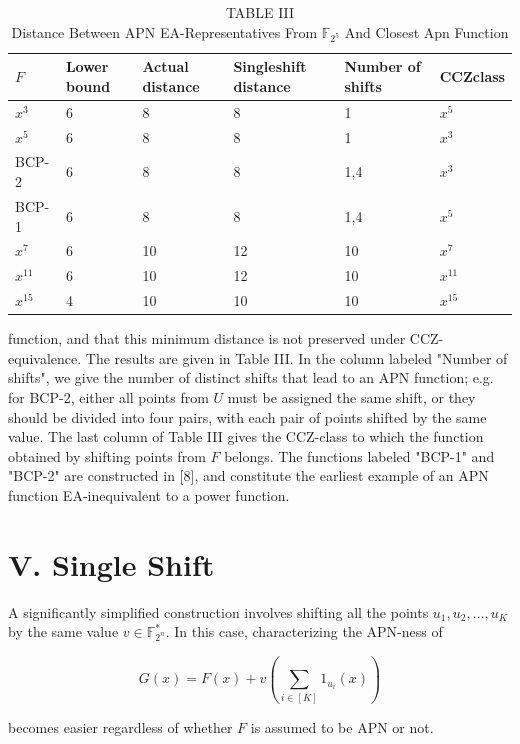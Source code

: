 \documentclass[10pt]{article}
\begin{document}
\begin{table}[h]
\begin{center}
\captionsetup{labelformat=empty}
\caption{TABLE III\\
Distance Between APN EA-Representatives From $\mathbb{F}_{2^{5}}$ And Closest Apn Function}
\begin{tabular}{|l|l|l|l|l|l|}
\hline
$F$ & Lower bound & Actual distance & Singleshift distance & Number of shifts & CCZclass \\
\hline
$x^{3}$ & 6 & 8 & 8 & 1 & $x^{5}$ \\
\hline
$x^{5}$ & 6 & 8 & 8 & 1 & $x^{3}$ \\
\hline
BCP-2 & 6 & 8 & 8 & 1,4 & $x^{3}$ \\
\hline
BCP-1 & 6 & 8 & 8 & 1,4 & $x^{5}$ \\
\hline
$x^{7}$ & 6 & 10 & 12 & 10 & $x^{7}$ \\
\hline
$x^{11}$ & 6 & 10 & 12 & 10 & $x^{11}$ \\
\hline
$x^{15}$ & 4 & 10 & 10 & 10 & $x^{15}$ \\
\hline
\end{tabular}
\end{center}
\end{table}

function, and that this minimum distance is not preserved under CCZ-equivalence. The results are given in Table III. In the column labeled "Number of shifts", we give the number of distinct shifts that lead to an APN function; e.g. for BCP-2, either all points from $U$ must be assigned the same shift, or they should be divided into four pairs, with each pair of points shifted by the same value. The last column of Table III gives the CCZ-class to which the function obtained by shifting points from $F$ belongs. The functions labeled "BCP-1" and "BCP-2" are constructed in [8], and constitute the earliest example of an APN function EA-inequivalent to a power function.

\section*{V. Single Shift}
A significantly simplified construction involves shifting all the points $u_{1}, u_{2}, \ldots, u_{K}$ by the same value $v \in \mathbb{F}_{2^{n}}^{*}$. In this case, characterizing the APN-ness of

$$
G(x)=F(x)+v\left(\sum_{i \in[K]} 1_{u_{i}}(x)\right)
$$

becomes easier regardless of whether $F$ is assumed to be APN or not.
\end{document}
